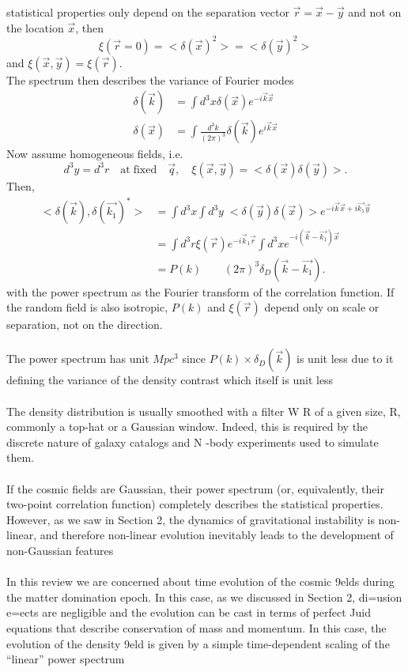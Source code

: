 \begin{description}
	statistical properties only depend on the separation vector $\vec{r}=\vec{x}-\vec{y}$ and not on the location $\vec{x}$, then 
	\[\xi(\vec{r}=0) = <\delta(\vec{x})^2> = <\delta(\vec{y})^2>\]
	and $\xi(\vec{x},\vec{y})= \xi(\vec{r})$.\\
	The spectrum then describes the variance of Fourier modes
	\begin{align*}
	\delta(\vec{k}) &= \int d^3 x \delta(\vec{x}) e^{- i \vec{k}\vec{x}}\\
	\delta(\vec{x})&= \int \frac{d^3k}{(2 \pi)^3} \delta(\vec{k}) e^{i \vec{k} \vec{x}}
	\end{align*} 
	Now assume homogeneous fields, i.e.
	\[d^3 y = d^3 r \quad \mathrm{at\; fixed} \quad \vec{q}, \quad  \xi(\vec{x},\vec{y})=<\delta( \vec{x}) \delta(\vec{y})>.\]
	Then, 
	\begin{align*}
	<\delta(\vec{k}), \delta(\vec{k_1})^* > &= \int d^3x \int d^3y \; <\delta(\vec{y})\delta(\vec{x})> e^{-i \vec{k}\vec{x}+ i \vec{k_1}\vec{y}}  \\
	&= \int d^3r \xi(\vec{r}) e^{-i \vec{k}_1\vec{r}} \int d^3x e^{-i (\vec{k}-\vec{k_1})\vec{x}} \\
	&= P(k) \quad \quad (2 \pi)^3 \delta_D(\vec{k}-\vec{k_1}).
	\end{align*}
	with the power spectrum as the Fourier transform of the correlation function. If the random field is also isotropic, $P(k)$ and $\xi(\vec{r})$ depend only on scale or separation, not on the direction.\\
	\\
	The power spectrum has unit $Mpc^3$ since $P(k) \times \delta_D(\vec{k})$ is unit less due to it defining the variance of the density contrast which itself is unit less
	\\
	\\
	The density distribution is usually smoothed with a filter W R of a given size, R, commonly a
	top-hat or a Gaussian window. Indeed, this is required by the discrete nature of galaxy catalogs
	and N -body experiments used to simulate them.
	\\
	\\If the cosmic fields are Gaussian, their power spectrum (or, equivalently, their two-point correlation function) completely describes the statistical properties.
	However, as we saw in Section 2, the dynamics of gravitational instability is non-linear, and therefore
	non-linear evolution inevitably leads to the development of non-Gaussian features
	\\
	\\
	In this review we are concerned about time evolution of the cosmic 9elds during the matter
	domination epoch. In this case, as we discussed in Section 2, di=usion e=ects are negligible and
	the evolution can be cast in terms of perfect Juid equations that describe conservation of mass and
	momentum. In this case, the evolution of the density 9eld is given by a simple time-dependent
	scaling of the “linear” power spectrum
	

\end{description}
